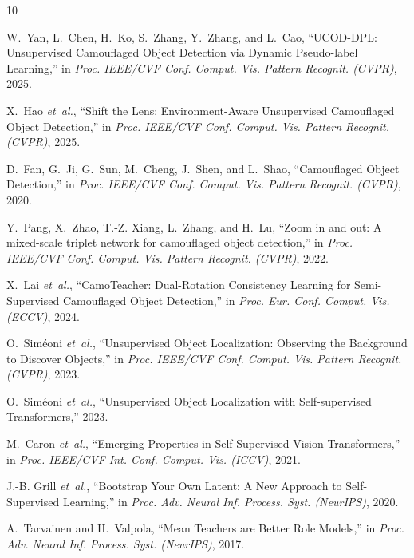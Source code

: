 \documentclass[journal,twoside,web]{IEEEtran}
\begin{document}

\begin{thebibliography}{10}

W.~Yan, L.~Chen, H.~Ko, S.~Zhang, Y.~Zhang, and L.~Cao,
``{UCOD-DPL}: Unsupervised Camouflaged Object Detection via Dynamic Pseudo-label Learning,''
in \emph{Proc. IEEE/CVF Conf. Comput. Vis. Pattern Recognit. (CVPR)}, 2025.

X.~Hao \emph{et~al.},
``Shift the Lens: Environment-Aware Unsupervised Camouflaged Object Detection,''
in \emph{Proc. IEEE/CVF Conf. Comput. Vis. Pattern Recognit. (CVPR)}, 2025.

D.~Fan, G.~Ji, G.~Sun, M.~Cheng, J.~Shen, and L.~Shao,
``Camouflaged Object Detection,''
in \emph{Proc. IEEE/CVF Conf. Comput. Vis. Pattern Recognit. (CVPR)}, 2020.

Y.~Pang, X.~Zhao, T.-Z. Xiang, L.~Zhang, and H.~Lu,
``Zoom in and out: A mixed-scale triplet network for camouflaged object detection,''
in \emph{Proc. IEEE/CVF Conf. Comput. Vis. Pattern Recognit. (CVPR)}, 2022.

X.~Lai \emph{et~al.},
``CamoTeacher: Dual-Rotation Consistency Learning for Semi-Supervised Camouflaged Object Detection,''
in \emph{Proc. Eur. Conf. Comput. Vis. (ECCV)}, 2024.

O.~Sim{\'e}oni \emph{et~al.},
``Unsupervised Object Localization: Observing the Background to Discover Objects,''
in \emph{Proc. IEEE/CVF Conf. Comput. Vis. Pattern Recognit. (CVPR)}, 2023.

O.~Sim{\'e}oni \emph{et~al.},
``Unsupervised Object Localization with Self-supervised Transformers,''
2023.

M.~Caron \emph{et~al.},
``Emerging Properties in Self-Supervised Vision Transformers,''
in \emph{Proc. IEEE/CVF Int. Conf. Comput. Vis. (ICCV)}, 2021.

J.-B. Grill \emph{et~al.},
``Bootstrap Your Own Latent: A New Approach to Self-Supervised Learning,''
in \emph{Proc. Adv. Neural Inf. Process. Syst. (NeurIPS)}, 2020.

A.~Tarvainen and H.~Valpola,
``Mean Teachers are Better Role Models,''
in \emph{Proc. Adv. Neural Inf. Process. Syst. (NeurIPS)}, 2017.

\end{thebibliography}
\end{document}
